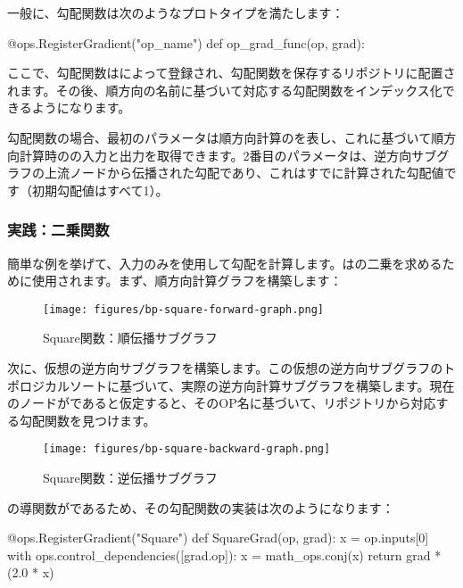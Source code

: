 \begin{content}
一般に、勾配関数は次のようなプロトタイプを満たします：

\begin{leftbar}
\begin{python}
@ops.RegisterGradient("op_name")
def op_grad_func(op, grad):
\end{python}
\end{leftbar}

ここで、勾配関数はによって登録され、勾配関数を保存するリポジトリに配置されます。その後、順方向の名前に基づいて対応する勾配関数をインデックス化できるようになります。

勾配関数の場合、最初のパラメータは順方向計算のを表し、これに基づいて順方向計算時のの入力と出力を取得できます。2番目のパラメータは、逆方向サブグラフの上流ノードから伝播された勾配であり、これはすでに計算された勾配値です（初期勾配値はすべて1）。

\subsubsection{実践：二乗関数}

簡単な例を挙げて、入力のみを使用して勾配を計算します。はの二乗を求めるために使用されます。まず、順方向計算グラフを構築します：

\begin{figure}[!h]
\centering
\texttt{[image: figures/bp-square-forward-graph.png]}
\caption{Square関数：順伝播サブグラフ}
 \label{fig:bp-square-forward-graph}
\end{figure}

次に、仮想の逆方向サブグラフを構築します。この仮想の逆方向サブグラフのトポロジカルソートに基づいて、実際の逆方向計算サブグラフを構築します。現在のノードがであると仮定すると、そのOP名に基づいて、リポジトリから対応する勾配関数を見つけます。

\begin{figure}[!htbp]
\centering
\texttt{[image: figures/bp-square-backward-graph.png]}
\caption{Square関数：逆伝播サブグラフ}
 \label{fig:bp-square-backward-graph}
\end{figure}

の導関数がであるため、その勾配関数の実装は次のようになります：

\begin{leftbar}
\begin{python}
@ops.RegisterGradient("Square")
def SquareGrad(op, grad):
  x = op.inputs[0]
  with ops.control_dependencies([grad.op]):
    x = math_ops.conj(x)
    return grad * (2.0 * x)
\end{python}
\end{leftbar}


\end{content}
